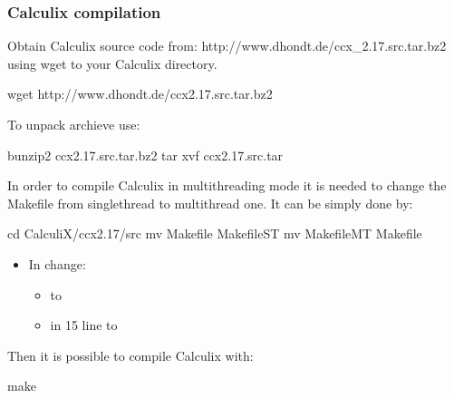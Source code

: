 \documentclass[letterpaper,10pt,english]{sphinxmanual}
\begin{document}
\subsubsection{Calculix compilation}
\label{\detokenize{software_setup/calculix:calculix-compilation}}
Obtain Calculix source code from: http://www.dhondt.de/ccx\_2.17.src.tar.bz2 using wget to your Calculix directory.

\begin{sphinxVerbatim}[commandchars=\\\{\}]
wget http://www.dhondt.de/ccx\PYGZus{}2.17.src.tar.bz2
\end{sphinxVerbatim}

To unpack archieve use:

\begin{sphinxVerbatim}[commandchars=\\\{\}]
bunzip2 ccx\PYGZus{}2.17.src.tar.bz2
tar xvf ccx\PYGZus{}2.17.src.tar
\end{sphinxVerbatim}

In order to compile Calculix in multithreading mode it is needed to change the Makefile from singlethread to multithread one. It can be simply done by:

\begin{sphinxVerbatim}[commandchars=\\\{\}]
cd CalculiX/ccx\PYGZus{}2.17/src
mv Makefile Makefile\PYGZus{}ST
mv Makefile\PYGZus{}MT Makefile
\end{sphinxVerbatim}
\begin{itemize}
\item {} 
In  change:
\begin{itemize}
\item {} 
 to 

\item {} 
in 15 line    to 

\end{itemize}

\end{itemize}

Then it is possible to compile Calculix with:

\begin{sphinxVerbatim}[commandchars=\\\{\}]
make
\end{sphinxVerbatim}
\end{document}
